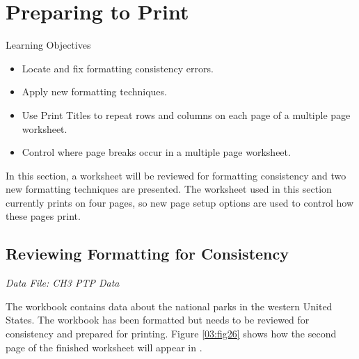\section{Preparing to Print}

\begin{center}
	\begin{objbox}{Learning Objectives}
		\begin{itemize}
			\setlength{\itemsep}{0pt}
			\setlength{\parskip}{0pt}
			\setlength{\parsep}{0pt}

			\item Locate and fix formatting consistency errors.
			\item Apply new formatting techniques.
			\item Use Print Titles to repeat rows and columns on each page of a multiple page worksheet.
			\item Control where page breaks occur in a multiple page worksheet.
			
		\end{itemize}
	\end{objbox}
\end{center}

In this section, a worksheet will be reviewed for formatting consistency and two new formatting techniques are presented. The worksheet used in this section currently prints on four pages, so new page setup options are used to control how these pages print. 

\subsection{Reviewing Formatting for Consistency}

\textit{Data File: CH3 PTP Data}

The workbook contains data about the national parks in the western United States. The workbook has been formatted but needs to be reviewed for consistency and prepared for printing. Figure \ref{03:fig26} shows how the second page of the finished worksheet will appear in .

